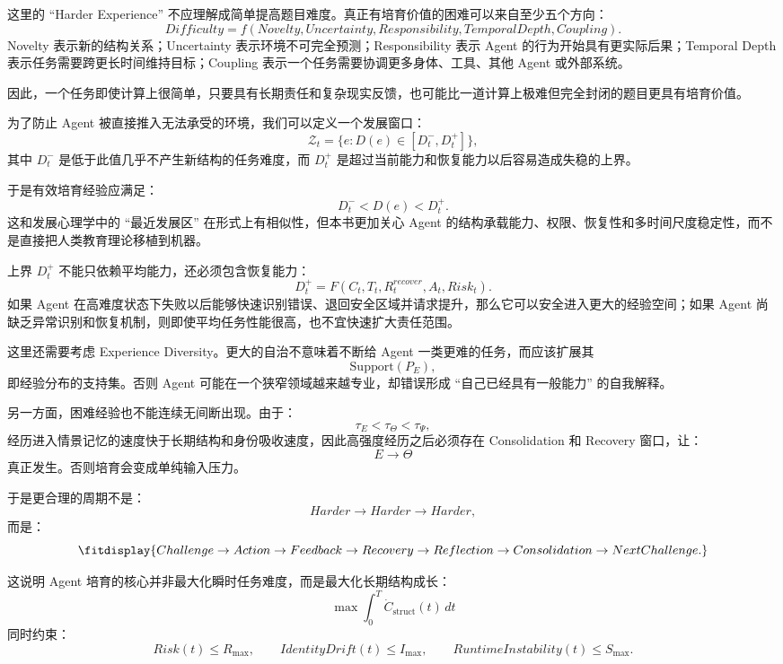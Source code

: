 这里的 ``Harder Experience'' 不应理解成简单提高题目难度。真正有培育价值的困难可以来自至少五个方向：
\[
Difficulty
=
f(
Novelty,
Uncertainty,
Responsibility,
TemporalDepth,
Coupling
).
\]
Novelty 表示新的结构关系；Uncertainty 表示环境不可完全预测；Responsibility 表示 Agent 的行为开始具有更实际后果；Temporal Depth 表示任务需要跨更长时间维持目标；Coupling 表示一个任务需要协调更多身体、工具、其他 Agent 或外部系统。

因此，一个任务即使计算上很简单，只要具有长期责任和复杂现实反馈，也可能比一道计算上极难但完全封闭的题目更具有培育价值。

为了防止 Agent 被直接推入无法承受的环境，我们可以定义一个发展窗口：
\[
\mathcal Z_t
=
\{
e:
D(e)
\in
[D^-_t,D^+_t]
\},
\]
其中 $D^-_t$ 是低于此值几乎不产生新结构的任务难度，而 $D^+_t$ 是超过当前能力和恢复能力以后容易造成失稳的上界。

于是有效培育经验应满足：
\[
D^-_t
<
D(e)
<
D^+_t.
\]
这和发展心理学中的 ``最近发展区'' 在形式上有相似性，但本书更加关心 Agent 的结构承载能力、权限、恢复性和多时间尺度稳定性，而不是直接把人类教育理论移植到机器。

上界 $D^+_t$ 不能只依赖平均能力，还必须包含恢复能力：
\[
D^+_t
=
F(
C_t,
T_t,
R^{recover}_t,
A_t,
Risk_t
).
\]
如果 Agent 在高难度状态下失败以后能够快速识别错误、退回安全区域并请求提升，那么它可以安全进入更大的经验空间；如果 Agent 尚缺乏异常识别和恢复机制，则即使平均任务性能很高，也不宜快速扩大责任范围。

这里还需要考虑 Experience Diversity。更大的自治不意味着不断给 Agent 一类更难的任务，而应该扩展其
\[
\mathrm{Support}(P_E),
\]
即经验分布的支持集。否则 Agent 可能在一个狭窄领域越来越专业，却错误形成 ``自己已经具有一般能力'' 的自我解释。

另一方面，困难经验也不能连续无间断出现。由于：
\[
\tau_E
<
\tau_\Theta
<
\tau_\Psi,
\]
经历进入情景记忆的速度快于长期结构和身份吸收速度，因此高强度经历之后必须存在 Consolidation 和 Recovery 窗口，让：
\[
E
\rightarrow
\Theta
\]
真正发生。否则培育会变成单纯输入压力。

于是更合理的周期不是：
\[
Harder
\rightarrow
Harder
\rightarrow
Harder,
\]
而是：
\[
\fitdisplay{
Challenge
\rightarrow
Action
\rightarrow
Feedback
\rightarrow
Recovery
\rightarrow
Reflection
\rightarrow
Consolidation
\rightarrow
NextChallenge.
}
\]

这说明 Agent 培育的核心并非最大化瞬时任务难度，而是最大化长期结构成长：
\[
\max
\int_0^T
\dot C_{\mathrm{struct}}(t)
\,dt
\]
同时约束：
\[
Risk(t)\leq R_{\max},
\qquad
IdentityDrift(t)\leq I_{\max},
\qquad
RuntimeInstability(t)\leq S_{\max}.
\]

